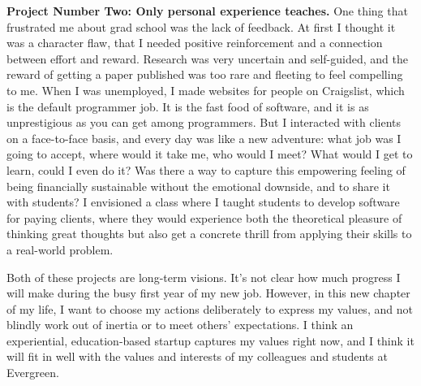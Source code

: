 \documentclass{article}
\begin{document}
\textbf{Project Number Two: Only personal experience teaches.}
One thing that frustrated me about
grad school was the lack of feedback. At first I
thought it was a character flaw, that I needed
positive reinforcement and a connection between
effort and reward. Research was very uncertain
and self-guided, and the reward of getting a paper
published
was too rare and fleeting to feel
compelling to me. When I was unemployed, I made
websites for people on Craigslist, which is the
default programmer job. It is the fast food of
software, and it is as unprestigious as you can get
among programmers.
But I interacted with clients on a face-to-face basis,
and every day was like a new adventure: what job was
I going to accept, where would it take me, who
would I meet?
What would I get to learn, could I even do it?
Was there a way to capture this empowering feeling
of being financially sustainable without the
emotional downside,
and to share it with students? I envisioned a
class where I taught students to develop software
for paying clients, where they would experience
both the theoretical pleasure of thinking great
thoughts but also get a concrete thrill from
applying their skills to a real-world problem.

Both of these projects are long-term visions.
It's not clear how much progress I will make during
the busy first year of my new job. However, in this
new chapter of my life, I want to choose my actions
deliberately to express my values, and not blindly
work out of inertia or to meet others' expectations.
I think an experiential, education-based startup
captures my values right now, and I think it will
fit in well with the values and interests of
my colleagues and students at Evergreen.
\end{document}
